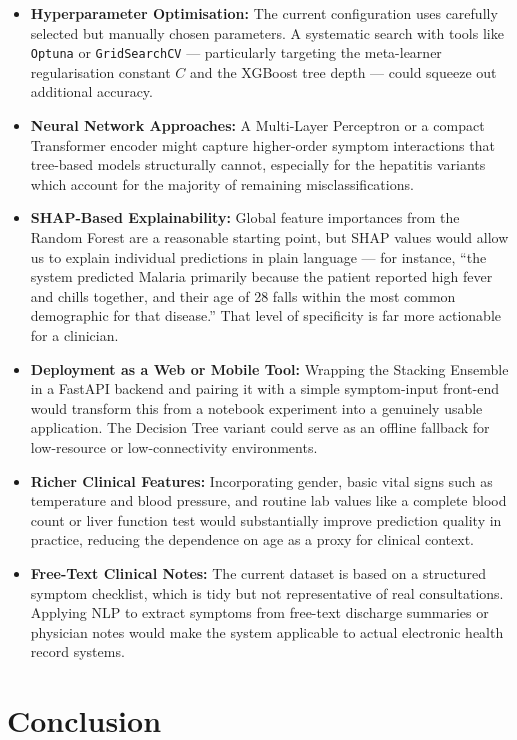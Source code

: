 \documentclass[12pt,a4paper]{article}
\begin{document}
\begin{itemize}
    \item \textbf{Hyperparameter Optimisation:} The current configuration uses carefully selected but manually chosen parameters. A systematic search with tools like \texttt{Optuna} or \texttt{GridSearchCV} --- particularly targeting the meta-learner regularisation constant $C$ and the XGBoost tree depth --- could squeeze out additional accuracy.
    \item \textbf{Neural Network Approaches:} A Multi-Layer Perceptron or a compact Transformer encoder might capture higher-order symptom interactions that tree-based models structurally cannot, especially for the hepatitis variants which account for the majority of remaining misclassifications.
    \item \textbf{SHAP-Based Explainability:} Global feature importances from the Random Forest are a reasonable starting point, but SHAP values would allow us to explain individual predictions in plain language --- for instance, ``the system predicted Malaria primarily because the patient reported high fever and chills together, and their age of 28 falls within the most common demographic for that disease.'' That level of specificity is far more actionable for a clinician.
    \item \textbf{Deployment as a Web or Mobile Tool:} Wrapping the Stacking Ensemble in a FastAPI backend and pairing it with a simple symptom-input front-end would transform this from a notebook experiment into a genuinely usable application. The Decision Tree variant could serve as an offline fallback for low-resource or low-connectivity environments.
    \item \textbf{Richer Clinical Features:} Incorporating gender, basic vital signs such as temperature and blood pressure, and routine lab values like a complete blood count or liver function test would substantially improve prediction quality in practice, reducing the dependence on age as a proxy for clinical context.
    \item \textbf{Free-Text Clinical Notes:} The current dataset is based on a structured symptom checklist, which is tidy but not representative of real consultations. Applying NLP to extract symptoms from free-text discharge summaries or physician notes would make the system applicable to actual electronic health record systems.
\end{itemize}

\section{Conclusion}
\end{document}

